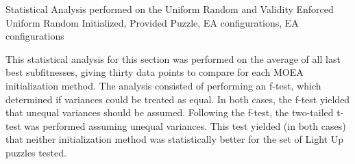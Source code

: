 \documentclass[11pt]{article}
\newcommand{\tablecaption}[1]{\caption{Statistical Analysis performed on the {#1}, EA configurations}}
\begin{document}
\begin{table}[H] 
\tablecaption{Uniform Random and Validity Enforced Uniform Random Initialized, Provided Puzzle, EA configurations}        
\label{init_provided}                 
\end{table}


This statistical analysis for this section was performed on the average of all last best subfitnesses, giving thirty
data points to compare for each MOEA initialization method. The analysis consisted of 
performing an f-test, which determined if variances could be
treated as equal. In both cases, the f-test yielded that unequal variances should be assumed. Following
 the f-test, the two-tailed t-test was performed assuming unequal variances. This test yielded
(in both cases) that neither initialization method was statistically better for the set of Light Up
puzzles tested.
\end{document}
